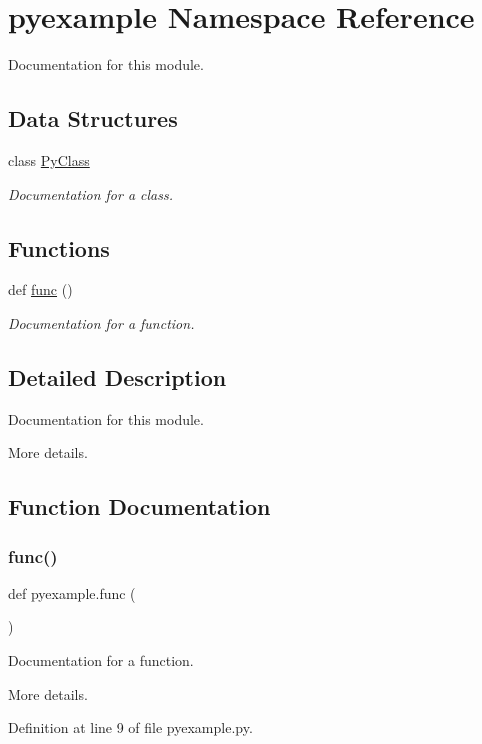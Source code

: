\hypertarget{namespacepyexample}{}\section{pyexample Namespace Reference}
\label{namespacepyexample}


Documentation for this module.  


\subsection*{Data Structures}
\begin{DoxyCompactItemize}
\item 
class \hyperlink{classpyexample_1_1_py_class}{Py\+Class}
\begin{DoxyCompactList}\small\item\em Documentation for a class. \end{DoxyCompactList}\end{DoxyCompactItemize}
\subsection*{Functions}
\begin{DoxyCompactItemize}
\item 
def \hyperlink{namespacepyexample_a2daf35288bc9d0a1d4233ab18b553451}{func} ()
\begin{DoxyCompactList}\small\item\em Documentation for a function. \end{DoxyCompactList}\end{DoxyCompactItemize}


\subsection{Detailed Description}
Documentation for this module. 

More details. 

\subsection{Function Documentation}
\mbox{\label{namespacepyexample_a2daf35288bc9d0a1d4233ab18b553451}} 
\subsubsection{\texorpdfstring{func()}{func()}}
{\footnotesize\ttfamily def pyexample.\+func (\begin{DoxyParamCaption}{ }\end{DoxyParamCaption})}



Documentation for a function. 

More details. 

Definition at line 9 of file pyexample.\+py.


